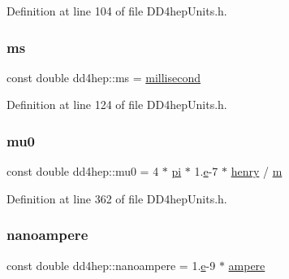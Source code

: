 Definition at line 104 of file D\+D4hep\+Units.\+h.

\hypertarget{namespacedd4hep_a75a019cb4a909458c79262a2a401662a}{}\label{namespacedd4hep_a75a019cb4a909458c79262a2a401662a} 
\subsubsection{\texorpdfstring{ms}{ms}}
{\footnotesize\ttfamily const double dd4hep\+::ms = \hyperlink{namespacedd4hep_ac5b763830694c4ae41e03dc174f1cc79}{millisecond}\hspace{0.3cm}{\ttfamily [static]}}



Definition at line 124 of file D\+D4hep\+Units.\+h.

\hypertarget{namespacedd4hep_aa3e5df0c9242afa74216e69bac6e639b}{}\label{namespacedd4hep_aa3e5df0c9242afa74216e69bac6e639b} 
\subsubsection{\texorpdfstring{mu0}{mu0}}
{\footnotesize\ttfamily const double dd4hep\+::mu0 = 4 $\ast$ \hyperlink{namespacedd4hep_ae71f82066d68af053eb8f60d0e13d3af}{pi} $\ast$ 1.\hyperlink{_volumes_8cpp_a8a9a1f93e9b09afccaec215310e64142}{e}-\/7 $\ast$ \hyperlink{namespacedd4hep_adc130a4b9874431a4fb19fa27220372c}{henry} / \hyperlink{namespacedd4hep_a443d1517e365c8f0c3a498bff0f09088}{m}\hspace{0.3cm}{\ttfamily [static]}}



Definition at line 362 of file D\+D4hep\+Units.\+h.

\hypertarget{namespacedd4hep_aab51ca424c36f5bc349f01bf9c502f2d}{}\label{namespacedd4hep_aab51ca424c36f5bc349f01bf9c502f2d} 
\subsubsection{\texorpdfstring{nanoampere}{nanoampere}}
{\footnotesize\ttfamily const double dd4hep\+::nanoampere = 1.\hyperlink{_volumes_8cpp_a8a9a1f93e9b09afccaec215310e64142}{e}-\/9 $\ast$ \hyperlink{namespacedd4hep_a1342ab2280c2fed87fe4beaebae8cf52}{ampere}\hspace{0.3cm}{\ttfamily [static]}}



